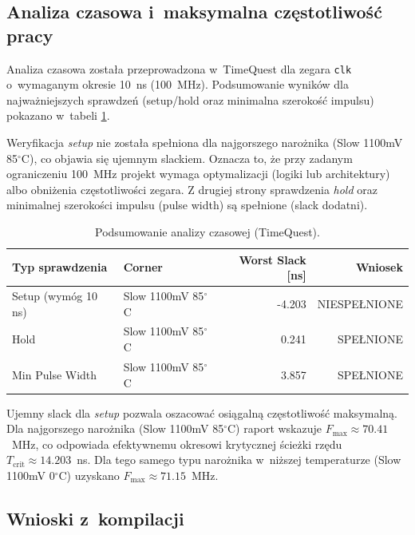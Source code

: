 \subsection{Analiza czasowa i~maksymalna częstotliwość pracy}
\label{subsec:timing_analysis}

Analiza czasowa została przeprowadzona w~TimeQuest dla zegara \texttt{clk} o~wymaganym okresie 10~ns (100~MHz).
Podsumowanie wyników dla najważniejszych sprawdzeń (setup/hold oraz minimalna szerokość impulsu) pokazano w~tabeli
\ref{tab:timing_summary}.

Weryfikacja \textit{setup} nie została spełniona dla najgorszego narożnika (Slow 1100mV 85$^\circ$C),
co objawia się ujemnym slackiem. Oznacza to, że przy zadanym ograniczeniu 100~MHz projekt wymaga optymalizacji
(logiki lub architektury) albo obniżenia częstotliwości zegara. Z drugiej strony sprawdzenia \textit{hold}
oraz minimalnej szerokości impulsu (pulse width) są spełnione (slack dodatni).

\begin{table}[!ht]
\centering
\caption{Podsumowanie analizy czasowej (TimeQuest).}
\label{tab:timing_summary}
\begin{tabular}{llrr}
\hline
Typ sprawdzenia & Corner & Worst Slack [ns] & Wniosek \\
\hline
Setup (wymóg 10 ns) & Slow 1100mV 85$^\circ$C & -4.203 & NIESPEŁNIONE \\
Hold & Slow 1100mV 85$^\circ$C & 0.241 & SPEŁNIONE \\
Min Pulse Width & Slow 1100mV 85$^\circ$C & 3.857 & SPEŁNIONE \\
\hline
\end{tabular}
\end{table}

Ujemny slack dla \textit{setup} pozwala oszacować osiągalną częstotliwość maksymalną.
Dla najgorszego narożnika (Slow 1100mV 85$^\circ$C) raport wskazuje $F_{\max}\approx 70.41$~MHz,
co odpowiada efektywnemu okresowi krytycznej ścieżki rzędu $T_{\mathrm{crit}}\approx 14.203$~ns.
Dla tego samego typu narożnika w~niższej temperaturze (Slow 1100mV 0$^\circ$C) uzyskano
$F_{\max}\approx 71.15$~MHz.

\subsection{Wnioski z~kompilacji}
\label{subsec:impl_conclusions}

